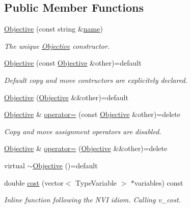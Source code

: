 \subsection*{Public Member Functions}
\begin{DoxyCompactItemize}
\item 
\hyperlink{classghost_1_1Objective_a05c72fc98983001626a5ffd4609fc4d1}{Objective} (const string \&\hyperlink{classghost_1_1Objective_a02aee324f6958b6c533f27ec430690fe}{name})
\begin{DoxyCompactList}\small\item\em The unique \hyperlink{classghost_1_1Objective}{Objective} constructor. \end{DoxyCompactList}\item 
\hyperlink{classghost_1_1Objective_a55b4f0ff2fdfc2ace35db536cc95ba20}{Objective} (const \hyperlink{classghost_1_1Objective}{Objective} \&other)=default
\begin{DoxyCompactList}\small\item\em Default copy and move contructors are explicitely declared. \end{DoxyCompactList}\item 
\hyperlink{classghost_1_1Objective_afb34a86055233acc3ebfb783f96a8e89}{Objective} (\hyperlink{classghost_1_1Objective}{Objective} \&\&other)=default
\item 
\hyperlink{classghost_1_1Objective}{Objective} \& \hyperlink{classghost_1_1Objective_a20f373a941afba7e3b6dbeb04ee4122d}{operator=} (const \hyperlink{classghost_1_1Objective}{Objective} \&other)=delete
\begin{DoxyCompactList}\small\item\em Copy and move assignment operators are disabled. \end{DoxyCompactList}\item 
\hyperlink{classghost_1_1Objective}{Objective} \& \hyperlink{classghost_1_1Objective_a8efc3f91216e6f50685e09da8cc3f04c}{operator=} (\hyperlink{classghost_1_1Objective}{Objective} \&\&other)=delete
\item 
virtual \hyperlink{classghost_1_1Objective_aade47b263cbe7cae55e237b423dc4895}{$\sim$\+Objective} ()=default
\item 
double \hyperlink{classghost_1_1Objective_ac46e9305c3a92db9dff2d233a7c07088}{cost} (vector$<$ Type\+Variable $>$ $\ast$variables) const 
\begin{DoxyCompactList}\small\item\em Inline function following the N\+VI idiom. Calling v\+\_\+cost. \end{DoxyCompactList}\item 

\end{DoxyCompactItemize}
